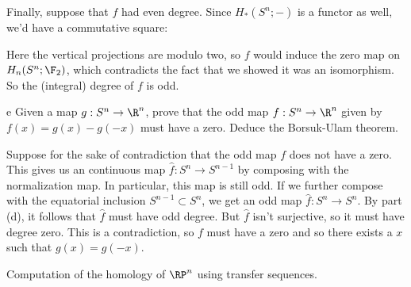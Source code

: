 \documentclass[11pt,letterpaper]{article}
\begin{document}
\begin{solution}
    \quad Finally, suppose that $f$ had even degree. Since $H_*(S^n;-)$ is a functor as well, we'd have a commutative square:
    \begin{center}
    \end{center}
    Here the vertical projections are modulo two, so $f$ would induce the zero map on $H_n(S^n;\F_2)$, which contradicts the fact that we showed it was an isomorphism. So the (integral) degree of $f$ is odd. 

    \begin{partproblem}{e}
        Given a map $g : S^n \to \R^n$, prove that the odd map $f : S^n \to \R^n$ given by $f(x)=g(x)-g(-x)$ must have a zero. Deduce the Borsuk-Ulam theorem. %
    \end{partproblem}

    \quad Suppose for the sake of contradiction that the odd map $f$ does not have a zero. This gives us an continuous map $\widehat{f} : S^n \to S^{n-1}$ by composing with the normalization map. In particular, this map is still odd. If we further compose with the equatorial inclusion $S^{n-1}\subset S^n$, we get an odd map $\widehat{f} : S^n \to S^n$. By part (d), it follows that $\widehat{f}$ must have odd degree. But $\widehat{f}$ isn't surjective, so it must have degree zero. This is a contradiction, so $f$ must have a zero and so there exists a $x$ such that $g(x)=g(-x)$. 
\end{solution}

\begin{problem}
    Computation of the homology of $\RP^n$ using transfer sequences.
\end{problem}
\end{document}
